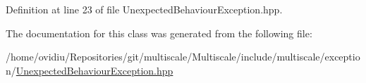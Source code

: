 \-Definition at line 23 of file \-Unexpected\-Behaviour\-Exception.\-hpp.



\-The documentation for this class was generated from the following file\-:\begin{DoxyCompactItemize}
\item 
/home/ovidiu/\-Repositories/git/multiscale/\-Multiscale/include/multiscale/exception/\hyperlink{UnexpectedBehaviourException_8hpp}{\-Unexpected\-Behaviour\-Exception.\-hpp}\end{DoxyCompactItemize}
